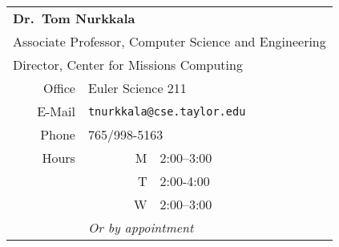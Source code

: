 \begin{center}
  \begin{tabular}{rrl}
    \toprule
    \multicolumn{3}{l}{\textbf{Dr.\ Tom Nurkkala}}                            \\
    \multicolumn{3}{l}{Associate Professor, Computer Science and Engineering} \\
    \multicolumn{3}{l}{Director, Center for Missions Computing}               \\
    \midrule
    Office & \multicolumn{2}{l}{Euler Science 211}                            \\
    E-Mail & \multicolumn{2}{l}{\texttt{tnurkkala@cse.taylor.edu}}            \\
    Phone  & \multicolumn{2}{l}{765/998-5163}                                 \\
    Hours  & M & 2:00--3:00                                                   \\
           & T & 2:00-4:00                                                    \\
           & W & 2:00--3:00                                                   \\
           & \multicolumn{2}{l}{\emph{Or by appointment}}                     \\
    \bottomrule
  \end{tabular}
\end{center}


